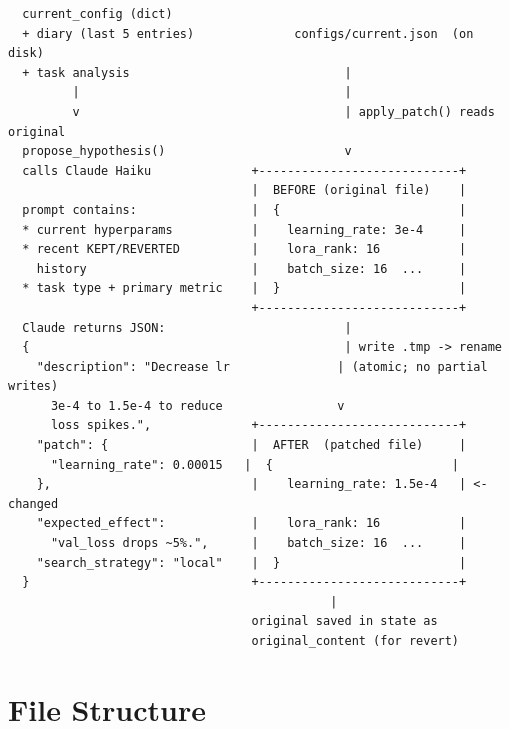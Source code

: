 \documentclass[11pt, letterpaper]{article}
\begin{document}
\begin{verbatim}
  current_config (dict)
  + diary (last 5 entries)              configs/current.json  (on disk)
  + task analysis                              |
         |                                     |
         v                                     | apply_patch() reads original
  propose_hypothesis()                         v
  calls Claude Haiku              +----------------------------+
                                  |  BEFORE (original file)    |
  prompt contains:                |  {                         |
  * current hyperparams           |    learning_rate: 3e-4     |
  * recent KEPT/REVERTED          |    lora_rank: 16           |
    history                       |    batch_size: 16  ...     |
  * task type + primary metric    |  }                         |
                                  +----------------------------+
  Claude returns JSON:                         |
  {                                            | write .tmp -> rename
    "description": "Decrease lr               | (atomic; no partial writes)
      3e-4 to 1.5e-4 to reduce                v
      loss spikes.",              +----------------------------+
    "patch": {                    |  AFTER  (patched file)     |
      "learning_rate": 0.00015   |  {                         |
    },                            |    learning_rate: 1.5e-4   | <- changed
    "expected_effect":            |    lora_rank: 16           |
      "val_loss drops ~5%.",      |    batch_size: 16  ...     |
    "search_strategy": "local"    |  }                         |
  }                               +----------------------------+
                                             |
                                  original saved in state as
                                  original_content (for revert)
\end{verbatim}

\section{File Structure}
\end{document}
